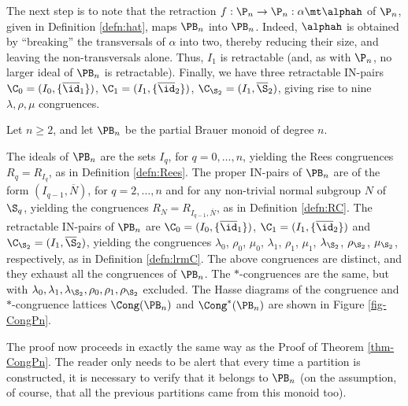 The next step is to note that the retraction $f:\P_n\to\P_n:\alpha\mt\alphah$ of $\P_n$, given in Definition \ref{defn:hat}, maps $\PB_n$ into $\PB_n$.  Indeed, $\alphah$ is obtained by ``breaking'' the transversals of $\alpha$ into two, thereby reducing their size, and leaving the non-transversals alone.  Thus, $I_1$ is retractable (and, as with $\P_n$, no larger ideal of $\PB_n$ is retractable).  Finally, we have three retractable IN-pairs $\C_0=(I_0,\{\overline{\id}_1\})$, $\C_1=(I_1,\{\overline{\id}_2\})$, $\C_{\S_2}=(I_1,\overline{\S}_2)$, giving rise to nine $\lambda,\rho,\mu$ congruences.





\begin{thm}\label{thm-CongPBn}
Let $n\geq2$, and let $\PB_n$ be the partial Brauer monoid of degree $n$.  
\begin{itemize}
 The ideals of $\PB_n$ are the sets $I_q$, for $q=0,\ldots,n$, yielding the Rees congruences $R_q=R_{I_q}$, as in Definition \ref{defn:Rees}.
 The proper IN-pairs of $\PB_n$ are of the form $(I_{q-1},\overline N)$, for $q=2,\ldots,n$ and for any non-trivial normal subgroup $N$ of $\S_q$, yielding the congruences $R_N=R_{I_{q-1},\overline N}$, as in Definition \ref{defn:RC}.
 The retractable IN-pairs of $\PB_n$ are $\C_0=(I_0,\{\overline{\id}_1\})$, $\C_1=(I_1,\{\overline{\id}_2\})$ and $\C_{\S_2}=(I_1,\overline{\S}_2)$, yielding the congruences $\lambda_0$, $\rho_0$, $\mu_0$, $\lambda_1$, $\rho_1$, $\mu_1$, $\lambda_{\S_2}$, $\rho_{\S_2}$, $\mu_{\S_2}$, respectively, as in Definition \ref{defn:lrmC}.
 The above congruences are distinct, and they exhaust all the congruences of $\PB_n$.
 The $\ast$-congruences are the same, but with $\lambda_0,\lambda_1,\lambda_{\S_2},\rho_0,\rho_1,\rho_{\S_2}$ excluded.
 The Hasse diagrams of the congruence and $*$-congruence lattices $\Cong(\PB_n)$ and $\Cong^*(\PB_n)$ are shown in Figure \ref{fig-CongPn}.
\end{itemize}
\end{thm}





The proof now proceeds in exactly the same way as the Proof of Theorem \ref{thm-CongPn}.
The reader only needs to be alert that every time a partition is constructed, it is necessary to verify that it belongs to $\PB_n$ (on the assumption, of course, that all the previous partitions came from this monoid too).

